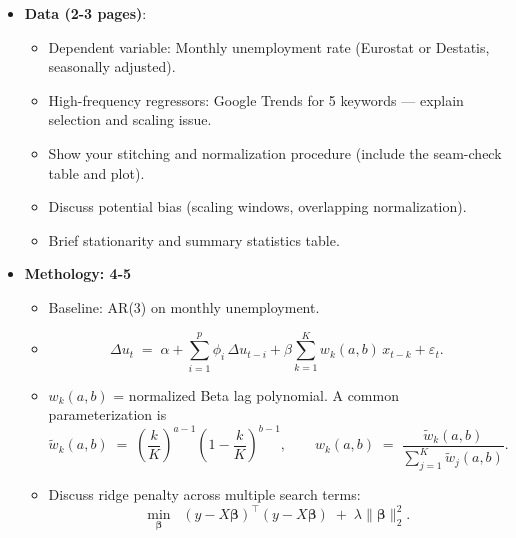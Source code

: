 \documentclass{article}
\begin{document}
\begin{itemize}
    \item \textbf{Data (2-3 pages)}:
    \begin{itemize}
        \item Dependent variable: Monthly unemployment rate (Eurostat or Destatis, seasonally adjusted).
        \item High-frequency regressors: Google Trends for 5 keywords — explain selection and scaling issue.
        \item Show your stitching and normalization procedure (include the seam-check table and plot).
        \item Discuss potential bias (scaling windows, overlapping normalization).
        \item Brief stationarity and summary statistics table.
    \end{itemize}

    \item \textbf{Methology: 4-5}
    \begin{itemize}
        \item Baseline: AR(3) on monthly  unemployment.
        \item \begin{equation}
  \Delta u_t \;=\; \alpha
  + \sum_{i=1}^{p} \phi_i \,\Delta u_{t-i}
  + \beta \sum_{k=1}^{K} w_k(a,b)\, x_{t-k}
  + \varepsilon_t .
  \label{eq:midas}
\end{equation}
\item $w_k(a,b)$ = normalized Beta lag polynomial. A common parameterization is
 \begin{equation}
    \tilde w_k(a,b) \;=\;
    \left(\frac{k}{K}\right)^{a-1}\!\left(1-\frac{k}{K}\right)^{b-1},
    \qquad
    w_k(a,b) \;=\; \frac{\tilde w_k(a,b)}{\sum_{j=1}^{K} \tilde w_j(a,b)} .
    \label{eq:beta-weights}
  \end{equation}
\item Discuss ridge penalty across multiple search terms:
\begin{equation}
  \min_{\bm{\beta}}\;\; (y - X\bm{\beta})^{\!\top}(y - X\bm{\beta})
  \;+\; \lambda \lVert \bm{\beta}\rVert_2^2 .
  \label{eq:ridge}
\end{equation}
    \end{itemize}


\end{itemize}
\end{document}
